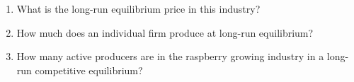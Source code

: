 \documentclass{article}
\begin{document}
\begin{enumerate}
	\begin{enumerate}
	
	\item What is the long-run equilibrium price in this industry?
	
	\item How much does an individual firm produce at long-run equilibrium?
	
	\item How many active producers are in the raspberry growing industry in a long-run competitive equilibrium?
	
	\end{enumerate}

\end{enumerate}
\end{document}
